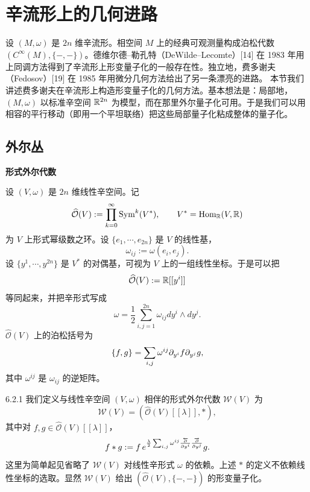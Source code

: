 
\section{辛流形上的几何进路}

设 $(M,\omega)$ 是 $2n$ 维辛流形。相空间 $M$ 上的经典可观测量构成泊松代数 $(C^\infty(M),\{-,-\})$。德维尔德–勒孔特（DeWilde–Lecomte）[14] 在 1983 年用上同调方法得到了辛流形上形变量子化的一般存在性。独立地，费多谢夫（Fedosov）[19] 在 1985 年用微分几何方法给出了另一条漂亮的进路。
本节我们讲述费多谢夫在辛流形上构造形变量子化的几何方法。基本想法是：局部地，$(M,\omega)$ 以标准辛空间 $\mathbb{R}^{2n}$ 为模型，而在那里外尔量子化可用。于是我们可以用相容的平行移动（即用一个平坦联络）把这些局部量子化粘成整体的量子化。

\subsection{外尔丛}

\textbf{形式外尔代数}

设 $(V,\omega)$ 是 $2n$ 维线性辛空间。记
\[
\widehat{\mathcal{O}}(V):=\prod_{k=0}^\infty\operatorname{Sym}^k(V^*),
\qquad V^*=\operatorname{Hom}_{\mathbb{R}}(V,\mathbb{R})
\]
为 $V$ 上形式幂级数之环。设 $\{e_1,\cdots,e_{2n}\}$ 是 $V$ 的线性基，
\[
\omega_{ij}:=\omega(e_i,e_j).
\]
设 $\{y^1,\cdots,y^{2n}\}$ 是 $V^*$ 的对偶基，可视为 $V$ 上的一组线性坐标。于是可以把
\[
\widehat{\mathcal{O}}(V):=\mathbb{R}[[y^i]]
\]
等同起来，并把辛形式写成
\[
\omega=\frac{1}{2}\sum_{i,j=1}^{2n}\omega_{ij}dy^i\wedge dy^j.
\]
$\widehat{\mathcal{O}}(V)$ 上的泊松括号为
\[
\{f,g\}=\sum_{i,j}\omega^{ij}\partial_{y^i}f\partial_{y^j}g,
\]
其中 $\omega^{ij}$ 是 $\omega_{ij}$ 的逆矩阵。

\begin{definition}{6.2.1}
  我们定义与线性辛空间 $(V,\omega)$ 相伴的形式外尔代数 $\mathcal{W}(V)$ 为
  \[
  \mathcal{W}(V)=\left(\widehat{\mathcal{O}}(V)[[\lambda]],*\right),
  \]
  其中对 $f,g\in\widehat{\mathcal{O}}(V)[[\lambda]]$，
  \[
  f*g:=f\,e^{\frac{\lambda}{2}\sum_{i,j}\omega^{ij}
  \frac{\overleftarrow{\partial}}{\partial y^i}
  \frac{\overrightarrow{\partial}}{\partial y^j}}g.
  \]
  这里为简单起见省略了 $\mathcal{W}(V)$ 对线性辛形式 $\omega$ 的依赖。上述 $*$ 的定义不依赖线性坐标的选取。显然 $\mathcal{W}(V)$ 给出 $\left(\widehat{\mathcal{O}}(V),\{-,-\}\right)$ 的形变量子化。
\end{definition}

